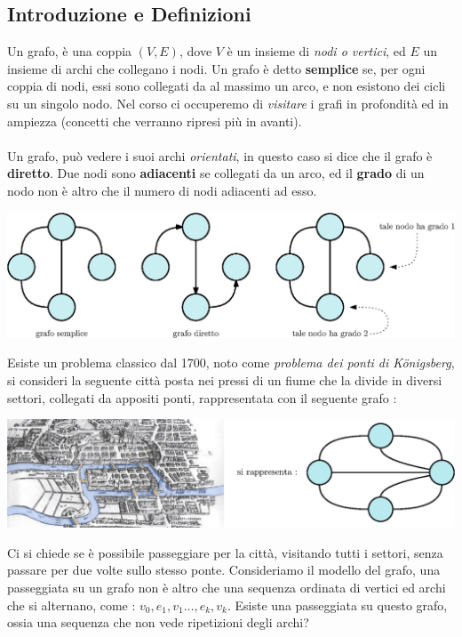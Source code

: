 \documentclass[12pt, letterpaper]{article}
\newcommand{\acc}{\\\hphantom{}\\}
\begin{document}
\subsection{Introduzione e Definizioni}
Un grafo, è una coppia $(V,E)$, dove $V$ è un insieme di \textit{nodi o vertici}, ed $E$ un 
insieme di archi che collegano i nodi. Un grafo è detto \textbf{semplice} se, per ogni 
coppia di nodi, essi sono collegati da al massimo un arco, e non esistono dei cicli su 
un singolo nodo. Nel corso ci occuperemo di \textit{visitare} i grafi in 
profondità ed in ampiezza (concetti che verranno ripresi più in avanti). \acc 
Un grafo, può vedere i suoi archi \textit{orientati}, in questo caso si dice che 
il grafo è \textbf{diretto}. Due nodi sono \textbf{adiacenti} se collegati da un arco, 
ed il \textbf{grado} di un nodo non è altro che il numero di nodi adiacenti ad esso.\begin{center}
    \includegraphics[width=1\textwidth ]{images/defGrafi.eps}
\end{center}
Esiste un problema classico dal 1700, noto come \textit{problema dei ponti di Königsberg}, 
si consideri la seguente città posta nei pressi di un fiume che la divide in diversi settori, collegati 
da appositi ponti, rappresentata con il seguente grafo :\begin{center}
    \includegraphics[width=1\textwidth ]{images/konigsberg.eps}
\end{center}
Ci si chiede se è possibile passeggiare per la città, visitando tutti i settori, senza passare per due volte 
sullo stesso ponte. Consideriamo il modello del grafo, una passeggiata su un grafo non è altro che una 
sequenza ordinata di vertici ed archi che si alternano, come : $v_0,e_1,v_1\dots, e_k,v_k$.
Esiste una passeggiata su questo grafo, ossia una sequenza che non vede ripetizioni degli archi?\acc 
\end{document}
